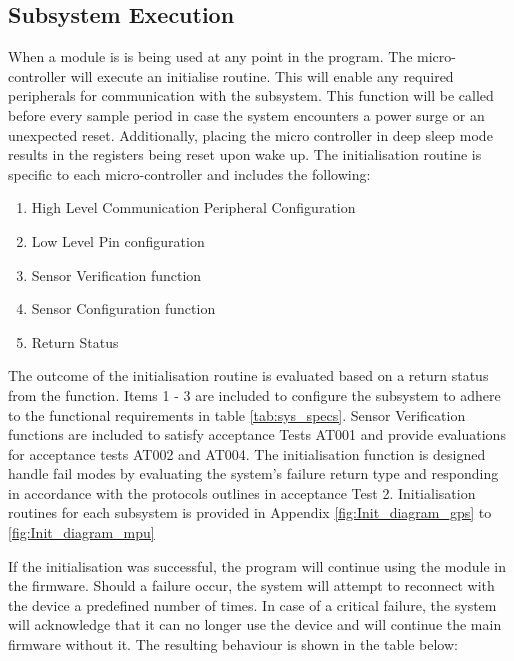 \subsection{Subsystem Execution}

When a module is is being used at any point in the program. The micro-controller will execute an initialise routine. This will enable any required peripherals for communication with the subsystem. This function will be called before every sample period in case the system encounters a power surge or an unexpected reset. Additionally, placing the micro controller in deep sleep mode results in the registers being reset upon wake up. The initialisation routine is specific to each micro-controller and includes the following:

\begin{enumerate}
    \item High Level Communication Peripheral Configuration
    \item Low Level Pin configuration
    \item Sensor Verification function
    \item Sensor Configuration function
    \item Return Status
\end{enumerate}

The outcome of the initialisation routine is evaluated based on a return status from the function. Items 1 - 3 are included to configure the subsystem to adhere to the functional requirements in table \ref{tab:sys_specs}. Sensor Verification functions are included to satisfy acceptance Tests AT001 and provide evaluations for acceptance tests AT002 and AT004. The initialisation function is designed handle fail modes by evaluating the system's failure return type and responding in accordance with the protocols outlines in acceptance Test 2. Initialisation routines for each subsystem is provided in Appendix \ref{fig:Init_diagram_gps} to \ref{fig:Init_diagram_mpu}

If the initialisation was successful, the program will continue using the module in the firmware. Should a failure occur, the system will attempt to reconnect with the device a predefined number of times. In case of a critical failure, the system will acknowledge that it can no longer use the device and will continue the main firmware without it. The resulting behaviour is shown in the table below:

